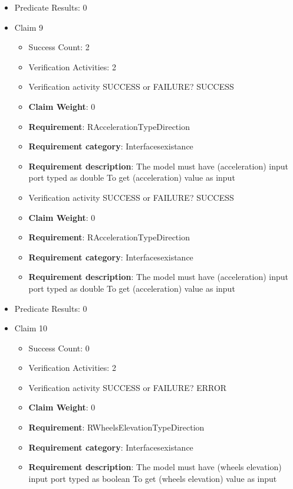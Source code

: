 \documentclass{article}
\begin{document}
\begin{itemize}
\begin{itemize}
				\end{itemize}
				
									    
				\item Predicate Results: 0

  				  \item Claim 9
				\begin{itemize}
			    	\item Success Count: 2 
			    	\item Verification Activities: 2
					\item Verification activity SUCCESS or FAILURE? SUCCESS
					\item \textbf{Claim Weight}: 0
						\item \textbf{Requirement}: RAccelerationTypeDirection 
						\item \textbf{Requirement category}: Interfacesexistance 
						\item \textbf{Requirement description}: The model must have (acceleration) input port typed as double To get (acceleration) value as input
					
					\item Verification activity SUCCESS or FAILURE? SUCCESS
					\item \textbf{Claim Weight}: 0
						\item \textbf{Requirement}: RAccelerationTypeDirection 
						\item \textbf{Requirement category}: Interfacesexistance 
						\item \textbf{Requirement description}: The model must have (acceleration) input port typed as double To get (acceleration) value as input
					
				\end{itemize}
				
									    
				\item Predicate Results: 0

  				  \item Claim 10
				\begin{itemize}
			    	\item Success Count: 0 
			    	\item Verification Activities: 2
					\item Verification activity SUCCESS or FAILURE? ERROR
					\item \textbf{Claim Weight}: 0
						\item \textbf{Requirement}: RWheelsElevationTypeDirection 
						\item \textbf{Requirement category}: Interfacesexistance 
						\item \textbf{Requirement description}: The model must have (wheels elevation) input port typed as boolean To get (wheels elevation) value as input
					

\end{itemize}
\end{itemize}
\end{document}
